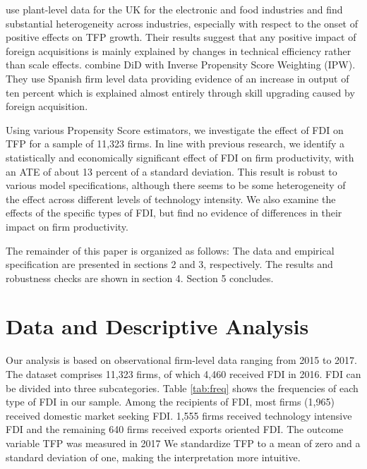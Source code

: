 \documentclass[a4paper,11pt]{scrartcl}
\begin{document}
\citet{girma2007} use plant-level data for the UK for the electronic and food industries and find substantial heterogeneity across industries, especially with respect to the onset of positive effects on TFP growth. Their results suggest that any positive impact of foreign acquisitions is mainly explained by changes in technical efficiency rather than scale effects. \citet{koch2019} combine DiD with Inverse Propensity Score Weighting (IPW). They use Spanish firm level data %
providing evidence of an increase in output of ten percent which is explained almost entirely through skill upgrading caused by foreign acquisition. 

Using various Propensity Score estimators, we investigate the effect of FDI on TFP for a sample of 11,323 firms. In line with previous research, we %
identify a statistically and economically significant effect of FDI on firm productivity, with an ATE of about 13 %
 percent of a standard deviation. This result is robust to various model specifications, although there seems to be some heterogeneity of the effect across different levels of technology intensity. We also examine the effects of the specific types of FDI, but find no evidence of differences in their impact on firm productivity.

The remainder of this paper is organized as follows: The data and empirical specification are presented in sections 2 and 3, respectively. The results and robustness checks are shown in section 4. Section 5 concludes.

\section{Data and Descriptive Analysis}
Our analysis is based on observational firm-level data ranging from 2015 to 2017. The dataset comprises 11,323 firms, of which 4,460 received FDI in 2016. FDI can be divided into three subcategories. Table \ref{tab:freq} shows the frequencies of each type of FDI in our sample. Among the recipients of FDI, most firms (1,965) received domestic market seeking FDI. 1,555 firms received technology intensive FDI and the remaining 640 firms received exports oriented FDI. The outcome variable TFP was measured in 2017 %
We standardize TFP %
to a mean of zero and a standard deviation of one, making the interpretation more intuitive. 
\end{document}
